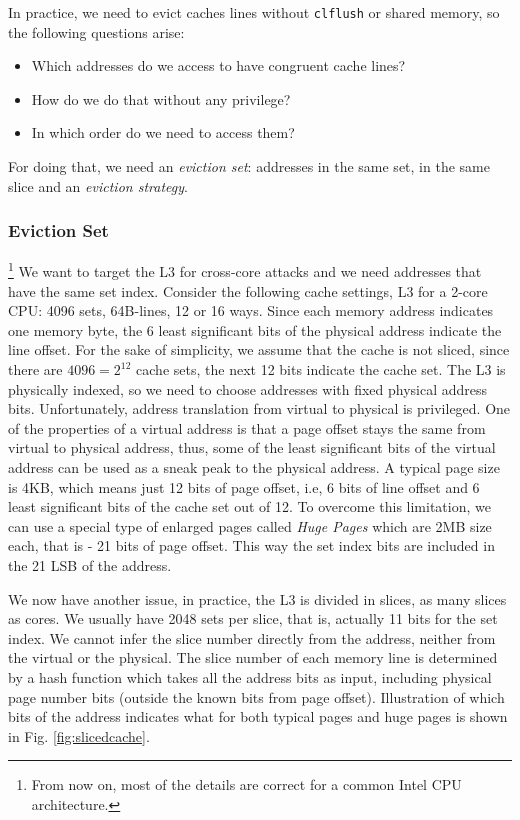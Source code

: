 In practice, we need to evict caches lines without \texttt{clflush} or shared memory, so the following questions arise:
\begin{itemize}
    \item Which addresses do we access to have congruent cache lines?
    \item How do we do that without any privilege?
    \item In which order do we need to access them?
\end{itemize}
For doing that, we need an \textit{eviction set}: addresses in the same set, in the same slice and an \textit{eviction strategy}.

\subsubsection{Eviction Set}\footnote{From now on, most of the details are correct for a common Intel CPU architecture.}
We want to target the L3 for cross-core attacks and we need addresses that have the same set index. Consider the following cache settings, L3 for a 2-core CPU: 4096 sets, 64B-lines, 12 or 16 ways. Since each memory address indicates one memory byte, the 6 least significant bits of the physical address indicate the line offset. For the sake of simplicity, we assume that the cache is not sliced, since there are $4096=2^{12}$ cache sets, the next 12 bits indicate the cache set. The L3 is physically indexed, so we need to choose addresses with fixed physical address bits. Unfortunately, address translation from virtual to physical is privileged. One of the properties of a virtual address is that a page offset stays the same from virtual to physical address, thus, some of the least significant bits of the virtual address can be used as a sneak peak to the physical address. A typical page size is 4KB, which means just 12 bits of page offset, i.e, 6 bits of line offset and 6 least significant bits of the cache set out of 12. To overcome this limitation, we can use a special type of enlarged pages called \textit{Huge Pages} which are 2MB size each, that is - 21 bits of page offset. This way the set index bits are included in the 21 LSB of the address.

We now have another issue, in practice, the L3 is divided in slices, as many slices as cores. We usually have 2048 sets per slice, that is, actually 11 bits for the set index. We cannot infer the slice number directly from the address, neither from the virtual or the physical. The slice number of each memory line is determined by a hash function which takes all the address bits as input, including physical page number bits (outside the known bits from page offset). Illustration of which bits of the address indicates what for both typical pages and huge pages is shown in Fig. \ref{fig:slicedcache}.

